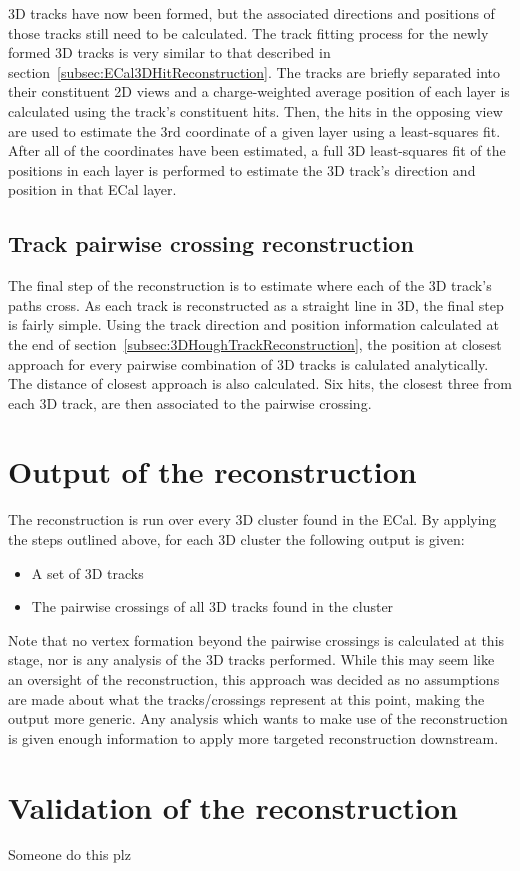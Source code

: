 \newline
3D tracks have now been formed, but the associated directions and positions of those tracks still need to be calculated.  The track fitting process for the newly formed 3D tracks is very similar to that described in section~\ref{subsec:ECal3DHitReconstruction}.  The tracks are briefly separated into their constituent 2D views and a charge-weighted average position of each layer is calculated using the track's constituent hits.  Then, the hits in the opposing view are used to estimate the 3rd coordinate of a given layer using a least-squares fit.  After all of the coordinates have been estimated, a full 3D least-squares fit of the positions in each layer is performed to estimate the 3D track's direction and position in that ECal layer.

\subsection{Track pairwise crossing reconstruction}
\label{subsec:TrackCrossingReconstruction}
The final step of the reconstruction is to estimate where each of the 3D track's paths cross.  As each track is reconstructed as a straight line in 3D, the final step is fairly simple.  Using the track direction and position information calculated at the end of section~\ref{subsec:3DHoughTrackReconstruction}, the position at closest approach for every pairwise combination of 3D tracks is calulated analytically.  The distance of closest approach is also calculated.  Six hits, the closest three from each 3D track, are then associated to the pairwise crossing. 

\section{Output of the reconstruction}
The reconstruction is run over every 3D cluster found in the ECal.  By applying the steps outlined above, for each 3D cluster the following output is given:
\begin{itemize}
  \item A set of 3D tracks
  \item The pairwise crossings of all 3D tracks found in the cluster
\end{itemize}
Note that no vertex formation beyond the pairwise crossings is calculated at this stage, nor is any analysis of the 3D tracks performed.  While this may seem like an oversight of the reconstruction, this approach was decided as no assumptions are made about what the tracks/crossings represent at this point, making the output more generic.  Any analysis which wants to make use of the reconstruction is given enough information to apply more targeted reconstruction downstream. 


%
\section{Validation of the reconstruction}
\label{sec:ReconstructionValidation}
Someone do this plz 
